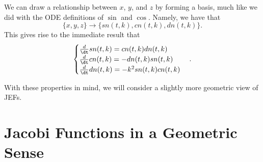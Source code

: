 \documentclass[notitlepage]{hw}
\begin{document}
We can draw a relationship between $x$, $y$, and $z$ by forming a basis, much like we did with the
ODE definitions of $\sin{}$ and $\cos{}$. Namely, we have that
\[
\{ x,y,z \}\to\{ sn(t,k),cn(t,k),dn(t,k) \}.
\]
This gives rise to the immediate result that
\[
\begin{cases}
{d\over\dt}sn(t,k)=cn(t,k)dn(t,k)\\
{d\over\dt}cn(t,k)=-dn(t,k)sn(t,k)\\
{d\over\dt}dn(t,k)=-k^{2}sn(t,k)cn(t,k)
\end{cases}.
\]

With these properties in mind, we will consider a slightly more geometric view of JEFs.

\section{Jacobi Functions in a Geometric Sense}
\end{document}
